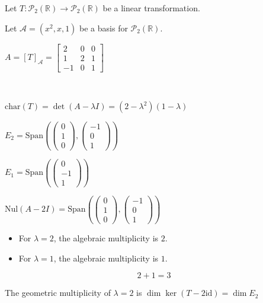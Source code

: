 \documentclass[11pt,fleqn]{book} %
\begin{document}
\begin{example}

Let $T: \mathcal{P}_2(\mathbb{R}) \to \mathcal{P}_2(\mathbb{R})$ be a linear transformation.

Let $\mathcal{A} = (x^2, x, 1)$ be a basis for $\mathcal{P}_2(\mathbb{R})$.

$A = [T]_\mathcal{A} = \begin{bmatrix} 2 &0 &0 \\ 1 &2 &1 \\ -1 &0 &1 \end{bmatrix}$

{~~~}

$\mathrm{char}(T) = \det(A - \lambda I) = (2 - \lambda^2)(1 - \lambda)$

$E_2 = \mathrm{Span}\left( \begin{pmatrix} 0 \\ 1 \\ 0 \end{pmatrix}, \begin{pmatrix} -1 \\ 0 \\ 1 \end{pmatrix} \right)$

$E_1 = \mathrm{Span}\left( \begin{pmatrix} 0 \\ -1 \\ 1 \end{pmatrix} \right)$

\end{example}


$\mathrm{Nul}(A - 2I) = \mathrm{Span}\left(\begin{pmatrix} 0 \\ 1 \\ 0 \end{pmatrix}, \begin{pmatrix} -1 \\ 0 \\ 1 \end{pmatrix}\right)$

\begin{itemize}
    \item For $\lambda = 2$, the algebraic multiplicity is $2$.
    \item For $\lambda = 1$, the algebraic multiplicity is $1$.
\end{itemize}
$$2+1 = 3$$

The geometric multiplicity of $\lambda = 2$ is $\dim \ker (T - 2 \mathrm{id}) = \dim E_2$
\end{document}
